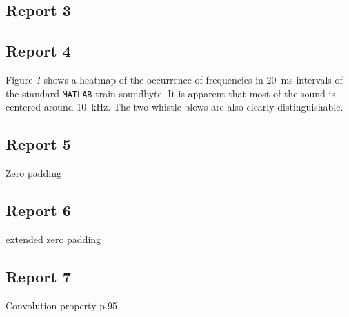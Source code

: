 \documentclass[11pt,titlepage]{report}
\begin{document}
\subsection{Report 3}



\subsection{Report 4}
Figure ? shows a heatmap of the occurrence of frequencies in \SI{20}{\milli \second} intervals of the standard \texttt{MATLAB} train soundbyte. It is apparent that most of the sound is centered around \SI{10}{\kilo\hertz}. The two whistle blows are also clearly distinguishable. 

\subsection{Report 5}
Zero padding
\subsection{Report 6}
extended zero padding
\subsection{Report 7}
Convolution property p.95
\end{document}
